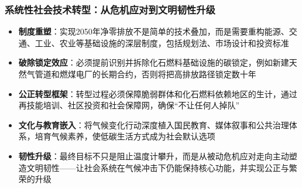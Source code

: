 \documentclass[11pt]{beamer}
\begin{document}
\begin{frame}\frametitle{系统性社会技术转型：从危机应对到文明韧性升级}
\begin{itemize}
  \item \textbf{制度重塑}：实现2050年净零排放不是简单的技术叠加，而是需要\alert{重构能源、交通、工业、农业等基础设施的深层制度}，包括规划法、市场设计和投资标准
  \item \textbf{破除锁定效应}：必须提前识别并拆除\alert{化石燃料基础设施的碳锁定}，例如新建天然气管道和燃煤电厂的长期合约，否则将把高排放路径锁定数十年
  \item \textbf{公正转型框架}：转型过程必须保障\alert{脆弱群体和化石燃料依赖地区的生计}，通过再技能培训、社区投资和社会保障网，确保“不让任何人掉队”
  \item \textbf{文化与教育嵌入}：将气候变化行动深度植入\alert{国民教育、媒体叙事和公共治理体系}，培育气候素养，使低碳生活方式成为社会默认选项
  \item \textbf{韧性升级}：最终目标不只是阻止温度计攀升，而是从被动危机应对走向主动塑造\alert{文明韧性}——让社会系统在气候冲击下仍能保持核心功能，并实现公正与繁荣的升级
\end{itemize}
\end{frame}
\end{document}

